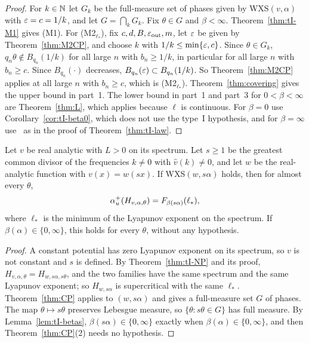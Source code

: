 \begin{proof}
For $k\in\mathbb N$ let $G_k$ be the full-measure set of phases given by WXS$(v,\alpha)$ with $\varepsilon=c=1/k$, and let $G=\bigcap_kG_k$. Fix $\theta\in G$ and $\beta<\infty$. Theorem~\ref{thm:tI-M1} gives (M1). For (M2$_{\ell_*}$), fix $c,d,B,\varepsilon_{\mathrm{out}},m$, let $\varepsilon$ be given by Theorem~\ref{thm:M2CP}, and choose $k$ with $1/k\le\min\{\varepsilon,c\}$. Since $\theta\in G_k$, $q_n\theta\notin B_{q_n}(1/k)$ for all large $n$ with $b_n\ge1/k$, in particular for all large $n$ with $b_n\ge c$. Since $B_{q_n}(\cdot)$ decreases, $B_{q_n}(\varepsilon)\subset B_{q_n}(1/k)$. So Theorem~\ref{thm:M2CP} applies at all large $n$ with $b_n\ge c$, which is (M2$_{\ell_*}$). Theorem~\ref{thm:covering} gives the upper bound in part~1. The lower bound in part~1 and part~3 for $0<\beta<\infty$ are Theorem~\ref{thm:L}, which applies because $\ell$ is continuous. For $\beta=0$ use Corollary~\ref{cor:tI-beta0}, which does not use the type~I hypothesis, and for $\beta=\infty$ use~\cite[Theorem~3(2)]{JZ2022} as in the proof of Theorem~\ref{thm:tI-law}.
\end{proof}

\begin{theorem}\label{thm:complete}
Let $v$ be real analytic with $L>0$ on its spectrum. Let $s\ge1$ be the greatest common divisor of the frequencies $k\ne0$ with $\hat v(k)\ne0$, and let $w$ be the real-analytic function with $v(x)=w(sx)$. If WXS$(w,s\alpha)$ holds, then for almost every $\theta$,
\[
\alpha_u^+(H_{v,\alpha,\theta})=F_{\beta(s\alpha)}(\ell_*),
\]
where $\ell_*$ is the minimum of the Lyapunov exponent on the spectrum. If $\beta(\alpha)\in\{0,\infty\}$, this holds for every $\theta$, without any hypothesis.
\end{theorem}

\begin{proof}
A constant potential has zero Lyapunov exponent on its spectrum, so $v$ is not constant and $s$ is defined. By Theorem~\ref{thm:tI-NP} and its proof, $H_{v,\alpha,\theta}=H_{w,s\alpha,s\theta}$, and the two families have the same spectrum and the same Lyapunov exponent; so $H_{w,s\alpha}$ is supercritical with the same $\ell_*$. Theorem~\ref{thm:CP} applies to $(w,s\alpha)$ and gives a full-measure set $G$ of phases. The map $\theta\mapsto s\theta$ preserves Lebesgue measure, so $\{\theta:s\theta\in G\}$ has full measure. By Lemma~\ref{lem:tI-betas}, $\beta(s\alpha)\in\{0,\infty\}$ exactly when $\beta(\alpha)\in\{0,\infty\}$, and then Theorem~\ref{thm:CP}(2) needs no hypothesis.
\end{proof}

